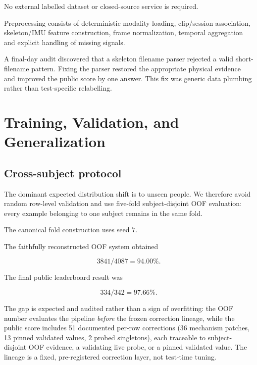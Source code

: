 \documentclass[12pt,a4paper]{article}
\begin{document}
No external labelled dataset or closed-source service is required.

Preprocessing consists of deterministic modality loading, clip/session
association, skeleton/IMU feature construction, frame normalization, temporal
aggregation and explicit handling of missing signals.

A final-day audit discovered that a skeleton filename parser rejected a valid
short-filename pattern. Fixing the parser restored the appropriate physical
evidence and improved the public score by one answer. This fix was generic
data plumbing rather than test-specific relabelling.

\section{Training, Validation, and Generalization}

\subsection{Cross-subject protocol}

The dominant expected distribution shift is to unseen people. We therefore
avoid random row-level validation and use five-fold subject-disjoint OOF
evaluation: every example belonging to one subject remains in the same fold.

The canonical fold construction uses seed \(7\).

The faithfully reconstructed OOF system obtained

\[
    3841/4087 = 94.00\%.
\]

The final public leaderboard result was

\[
    334/342 = 97.66\%.
\]

The gap is expected and audited rather than a sign of overfitting: the OOF
number evaluates the pipeline \emph{before} the frozen correction lineage,
while the public score includes 51 documented per-row corrections (36
mechanism patches, 13 pinned validated values, 2 probed singletons), each
traceable to subject-disjoint OOF evidence, a validating live probe, or a
pinned validated value. The lineage is a fixed, pre-registered correction
layer, not test-time tuning.
\end{document}

